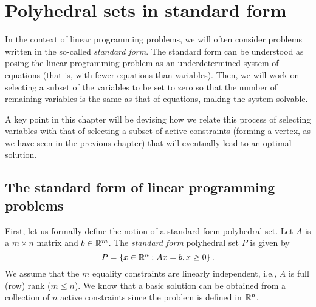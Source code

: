 \section{Polyhedral sets in standard form}

In the context of linear programming problems, we will often consider problems written in the so-called \emph{standard form}. The standard form can be understood as posing the linear programming problem as an underdetermined system of equations (that is, with fewer equations than variables). Then, we will work on selecting a subset of the variables to be set to zero so that the number of remaining variables is the same as that of equations, making the system solvable. 

A key point in this chapter will be devising how we relate this process of selecting variables with that of selecting a subset of active constraints (forming a vertex, as we have seen in the previous chapter) that will eventually lead to an optimal solution. 


\subsection{The standard form of linear programming problems}

First, let us formally define the notion of a standard-form polyhedral set. Let $A$ is a $m \times n$ matrix and $b \in \mathbb{R}^m$. The \emph{standard form} polyhedral set $P$ is given by 
%
\begin{equation*}
	P = \left\{ x \in \mathbb{R}^n : Ax = b, x \geq 0 \right \}.		
\end{equation*}
%
We assume that the $m$ equality constraints are linearly independent, i.e., $A$ is full (row) rank ($m \leq n$). We know that a basic solution can be obtained from a collection of $n$ active constraints since the problem is defined in $\mathbb{R}^n$. 

